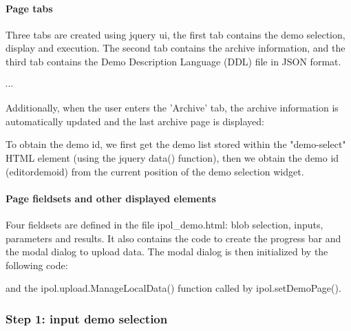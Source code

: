 \paragraph{Page tabs} Three tabs are created using jquery ui, the first tab
contains the demo selection, display and execution. The second tab contains
the archive information, and the third tab contains the Demo Description 
Language (DDL) file in JSON format.

$\cdots$


Additionally, when the user enters the 'Archive' tab, the archive information
is automatically updated and the last archive page is displayed:

To obtain the demo id, we first get the demo list stored within the "demo-select"
HTML element (using the jquery data() function), then we obtain the demo id 
(editordemoid) from the current position of the demo selection widget.

\paragraph{Page fieldsets and other displayed elements}

Four fieldsets are defined in the file ipol\_demo.html: blob selection, inputs, 
parameters and results. It also contains the code to create the progress bar
and the modal dialog to upload data.
The modal dialog is then initialized by the following code:

and the ipol.upload.ManageLocalData() function called by ipol.setDemoPage().

\subsubsection{Step 1: input demo selection}

